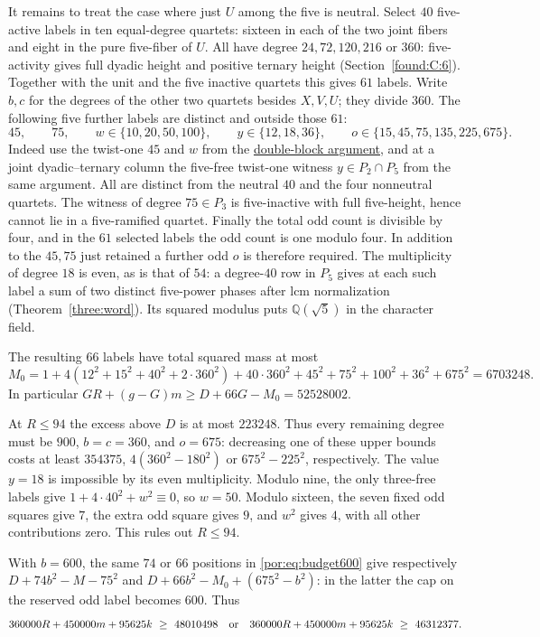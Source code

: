 \documentclass[11pt,a4paper]{article}
\numberwithin{equation}{section}
\theoremstyle{remark}
\newcommand{\QQ}{\mathbb Q}
\begin{document}
It remains to treat the case where just $U$ among the five is neutral. Select $40$ five-active labels in ten equal-degree quartets: sixteen in each of the two joint fibers and eight in the pure five-fiber of $U$. All have degree $24,72,120,216$ or $360$: five-activity gives full dyadic height and positive ternary height (Section~\ref{found:C:6}). Together with the unit and the five inactive quartets this gives $61$ labels. Write $b,c$ for the degrees of the other two quartets besides $X,V,U$; they divide $360$. The following five further labels are distinct and outside those $61$:
\[
           45,\qquad75,\qquad w\in\{10,20,50,100\},\qquad
           y\in\{12,18,36\},\qquad o\in\{15,45,75,135,225,675\}.
\]
Indeed use the twist-one $45$ and $w$ from the \hyperref[por:double-missing-ten]{double-block argument}, and at a joint dyadic--ternary column the five-free twist-one witness $y\in P_2\cap P_5$ from the same argument. All are distinct from the neutral $40$ and the four nonneutral quartets. The witness of degree $75\in P_3$ is five-inactive with full five-height, hence cannot lie in a five-ramified quartet. Finally the total odd count is divisible by four, and in the $61$ selected labels the odd count is one modulo four. In addition to the $45,75$ just retained a further odd $o$ is therefore required. The multiplicity of degree $18$ is even, as is that of $54$: a degree-$40$ row in $P_5$ gives at each such label a sum of two distinct five-power phases after lcm normalization (Theorem~\ref{three:word}). Its squared modulus puts $\QQ(\sqrt5)$ in the character field.

The resulting $66$ labels have total squared mass at most
\[
 M_0=1+4(12^2+15^2+40^2+2\cdot360^2)+40\cdot360^2+
                   45^2+75^2+100^2+36^2+675^2=6703248 .
\]
In particular $GR+(g-G)m\ge D+66G-M_0=52528002$.

At $R\le94$ the excess above $D$ is at most $223248$. Thus every remaining degree must be $900$, $b=c=360$, and $o=675$: decreasing one of these upper bounds costs at least $354375$, $4(360^2-180^2)$ or $675^2-225^2$, respectively. The value $y=18$ is impossible by its even multiplicity. Modulo nine, the only three-free labels give $1+4\cdot40^2+w^2\equiv0$, so $w=50$. Modulo sixteen, the seven fixed odd squares give $7$, the extra odd square gives $9$, and $w^2$ gives $4$, with all other contributions zero. This rules out $R\le94$.

With $b=600$, the same $74$ or $66$ positions in \eqref{por:eq:budget600} give respectively $D+74b^2-M-75^2$ and $D+66b^2-M_0+(675^2-b^2)$: in the latter the cap on the reserved odd label becomes $600$. Thus
\[
  360000R+450000m+95625k\ \ge\ 48010498
         \quad\hbox{or}\quad
  360000R+450000m+95625k\ \ge\ 46312377 .
\]
\end{document}
